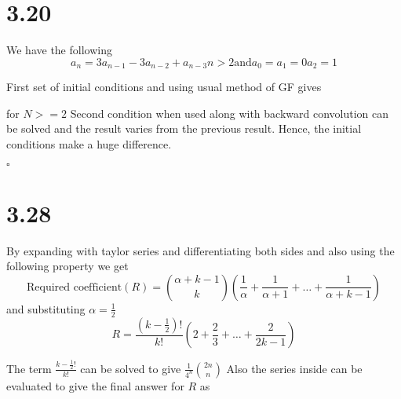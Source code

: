 \documentclass[a4paper,12pt]{article}
\begin{document}
\section*{3.20}
	We have the following
	\begin{equation}
		a_n = 3a_{n-1} - 3a_{n-2} + a_{n-3} n>2 \text{and} a_0 = a_1 = 0 a_2 = 1
	\end{equation}

	First set of initial conditions and using usual method of GF gives
	\centerline{}
	for $ N >= 2 $
	Second condition when used along with backward convolution can be solved and the result varies from the previous result. Hence, the initial conditions make a huge difference. 
	\centerline{}
	$\square$
\section*{3.28}
	By expanding with taylor series and differentiating both sides and also using the following property
		we get
	\begin{equation*}
		\text{Required coefficient}(R) = \binom{\alpha+k-1}{k} \left( \frac{1}{\alpha} + \frac{1}{\alpha + 1} + \ldots + \frac{1}{\alpha + k -1} \right)
	\end{equation*}
	and substituting $\alpha = \frac{1}{2}$
	\begin{equation*}
		R = \frac{(k-\frac{1}{2})!}{k!} \left( 2 + \frac{2}{3} + \ldots + \frac{2}{2k-1} \right)
	\end{equation*}

	The term $\frac{k-\frac{1}{2}!}{k!}$ can be solved to give $\frac{1}{4^n}\binom{2n}{n}$
	Also the series inside can be evaluated to give the final answer for $R$ as

\end{document}
